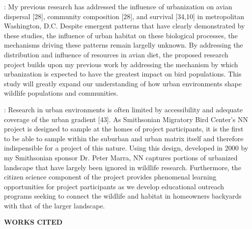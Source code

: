 \documentclass[12pt]{article}
\begin{document}

: 
My previous research has addressed the influence of urbanization on avian dispersal [28], community composition [28], and survival [34,10] in metropolitan Washington, D.C. Despite emergent patterns that have clearly demonstrated by these studies, the influence of urban habitat on these biological processes, the mechanisms driving these patterns remain largelly unknown. By addressing the distribution and influence of resources in avian diet, the proposed research project builds upon my previous work by addressing the mechanism by which urbanization is expected to have the greatest impact on bird populations. This study will greatly expand our understanding of how urban environments shape wildlife populations and communities.


:
Research in urban environments is often limited by accessibility and adequate coverage of the urban gradient [43]. As Smithsonian Migratory Bird Center's NN project is designed to sample at the homes of project participants, it is the first to be able to sample within the suburban and urban matrix itself and therefore indispensible for a project of this nature. Using this design, developed in 2000 by my Smithsonian sponsor Dr. Peter Marra,  NN captures portions of urbanized landscape that have largely been ignored in wildlife research. Furthermore, the citizen science component of the project provides phenomenal learning opportunities for project participants as we develop educational outreach programs seeking to connect the wildlife and habitat in homeowners backyards with that of the larger landscape.

\noindent \begin{center} {\textbf {WORKS CITED}}\end{center} \par
\end{document}
